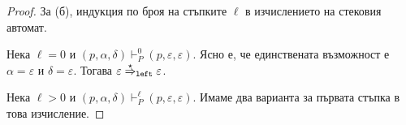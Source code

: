 \begin{proof}
  
  За (б), индукция по броя на стъпките $\ell$ в изчислението на стековия автомат.
    
      Нека $\ell = 0$ и $(p, \alpha, \delta) \vdash^{0}_P (p, \varepsilon, \varepsilon)$. Ясно е, че единствената възможност е $\alpha = \varepsilon$ и $\delta = \varepsilon$.
      Тогава $\varepsilon \stackrel{{\star}}{\Rightarrow}_{\texttt{left}} \varepsilon$.
      
      Нека $\ell > 0$ и $(p, \alpha, \delta) \vdash^{\ell}_P (p, \varepsilon, \varepsilon)$.      
      Имаме два варианта за първата стъпка в това изчисление.
      

\end{proof}
